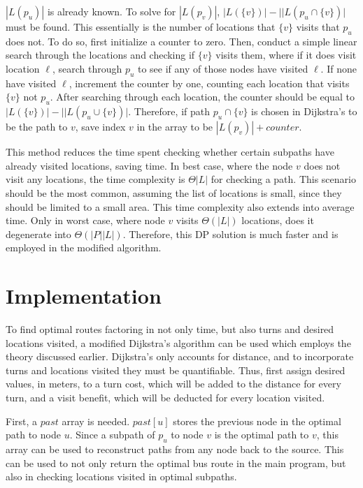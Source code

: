 \documentclass[letter,10pt]{article}
\begin{document}
$|L(p_u)|$ is already known. To solve for $|L(p_v)|$, $|L(\{v\})| - ||L(p_u \cap \{v\})|$ must be found. This essentially is the number of locations that $\{v\}$ visits that $p_u$ does not. To do so, first initialize a counter to zero. Then, conduct a simple linear search through the locations and checking if $\{v\}$ visits them, where if it does visit location $\ell$, search through $p_u$ to see if any of those nodes have visited $\ell$. If none have visited $\ell$, increment the counter by one, counting each location that visits $\{v\}$ not $p_u$. After searching through each location, the counter should be equal to $|L(\{v\})| - ||L(p_u \cup \{v\})|$. Therefore, if path $p_u \cap \{v\}$ is chosen in Dijkstra's to be the path to $v$, save index $v$ in the array to be $|L(p_v)|+counter$.

This method reduces the time spent checking whether certain subpaths have already visited locations, saving time. In best case, where the node $v$ does not visit any locations, the time complexity is $\Theta|L|$ for checking a path. This scenario should be the most common, assuming the list of locations is small, since they should be limited to a small area. This time complexity also extends into average time. Only in worst case, where node $v$ visits $\Theta(|L|)$ locations, does it degenerate into $\Theta(|P||L|)$. Therefore, this DP solution is much faster and is employed in the modified algorithm. 

\newpage
\section{Implementation}
To find optimal routes factoring in not only time, but also turns and desired locations visited, a modified Dijkstra's algorithm can be used which employs the theory discussed earlier. Dijkstra's only accounts for distance, and to incorporate turns and locations visited they must be quantifiable. Thus, first assign desired values, in meters, to a turn cost, which will be added to the distance for every turn, and a visit benefit, which will be deducted for every location visited. 

First, a $past$ array is needed. $past[u]$ stores the previous node in the optimal path to node $u$. Since a subpath of $p_u$ to node $v$ is the optimal path to $v$, this array can be used to reconstruct paths from any node back to the source. This can be used to not only return the optimal bus route in the main program, but also in checking locations visited in optimal subpaths.
\end{document}
